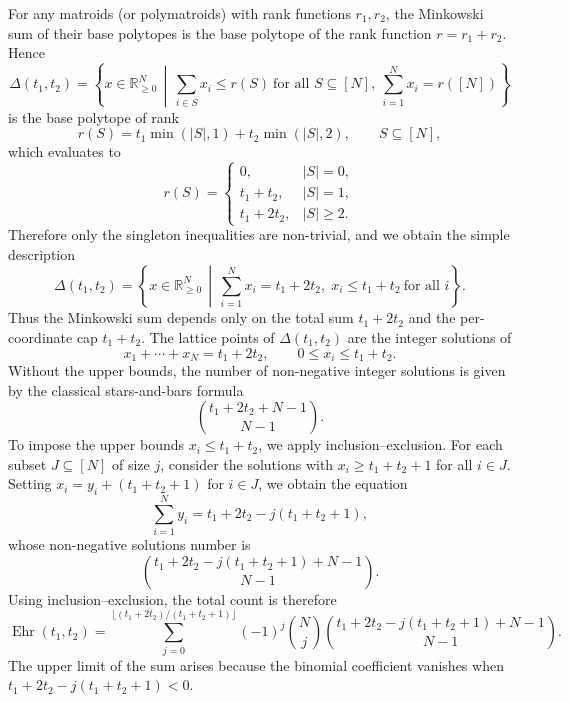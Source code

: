\documentclass[12pt,a4paper]{article}
\theoremstyle{plain}
\theoremstyle{remark}
\newcommand{\nprops}{N}
\newcommand{\Newton}{\Delta}
\DeclareMathOperator{\ehr}{Ehr}
\begin{document}
For any matroids (or polymatroids) with rank functions \(r_1,r_2\),
the Minkowski sum of their base polytopes is the base polytope of the
rank function \(r=r_1+r_2\).
Hence
\begin{equation}
\Newton(t_1,t_2)
= \left\{ x \in \mathbb{R}_{\ge 0}^\nprops \, \middle| \,
   \sum_{i \in S} x_i \le r(S)\ \text{for all } S \subseteq [\nprops],
   \ \sum_{i=1}^\nprops x_i = r([\nprops]) \right\}
\end{equation}
is the base polytope of rank
\begin{equation}
r(S) = t_1 \min(|S|,1) + t_2 \min(|S|,2), \qquad S \subseteq [\nprops],
\end{equation}
which evaluates to
\begin{equation}
r(S) =
\begin{cases}
0, & |S|=0,\\[4pt]
t_1+t_2, & |S|=1,\\[4pt]
t_1+2t_2, & |S|\ge 2.
\end{cases}
\end{equation}
Therefore only the singleton inequalities are non-trivial, and 
we obtain the simple description
\begin{equation}
\Newton(t_1,t_2)
= \left\{ x \in \mathbb{R}_{\ge 0}^\nprops \, \middle| \,
      \sum_{i=1}^\nprops x_i = t_1+2t_2, \; x_i \le t_1+t_2 \ \text{for all } i \right\}.
\end{equation}
Thus the Minkowski sum depends only on the total sum \(t_1+2t_2\)
and the per-coordinate cap \(t_1+t_2\).
The lattice points of \(\Newton(t_1,t_2)\) are the integer solutions of
\begin{equation}
x_1+\cdots+x_\nprops = t_1+2t_2, \qquad 0 \le x_i \le t_1+t_2.
\end{equation}
Without the upper bounds, the number of non-negative integer solutions
is given by the classical stars-and-bars formula
\begin{equation}
\binom{t_1+2t_2+\nprops-1}{\nprops-1}.
\end{equation}
To impose the upper bounds \(x_i \le t_1+t_2\), we apply inclusion--exclusion.
For each subset \(J \subseteq [\nprops]\) of size \(j\),
consider the solutions with \(x_i \ge t_1+t_2+1\) for all \(i\in J\).
Setting \(x_i = y_i + (t_1+t_2+1)\) for \(i\in J\),
we obtain the equation
\begin{equation}
\sum_{i=1}^\nprops y_i = t_1+2t_2 - j(t_1+t_2+1),
\end{equation}
whose non-negative solutions number is
\begin{equation}
\binom{t_1+2t_2 - j(t_1+t_2+1) + \nprops - 1}{\nprops-1}.
\end{equation}
Using inclusion--exclusion, the total count is therefore
\begin{equation}\label{e:Lsum}
\ehr(t_1,t_2)
= \sum_{j=0}^{\lfloor (t_1+2t_2)/(t_1+t_2+1)\rfloor}
    (-1)^j \binom{\nprops}{j}
    \binom{t_1+2t_2 - j(t_1+t_2+1) + \nprops - 1}{\nprops - 1}.
\end{equation}
The upper limit of the sum arises because the binomial coefficient
vanishes when \(t_1+2t_2-j(t_1+t_2+1) < 0\).
\end{document}
